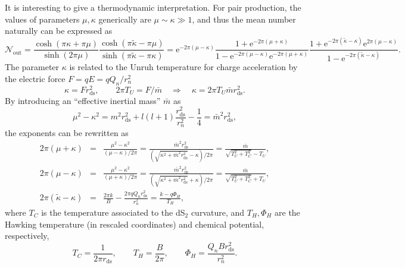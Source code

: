 \documentclass[aps,nofootinbib,superscriptaddress
]{revtex4}
\begin{document}
It is interesting to give a thermodynamic interpretation. For pair production, the values of parameters $\mu, \kappa$ generically are $\mu \sim \kappa \gg 1$, and thus the mean number naturally can be expressed as
\begin{equation}
\mathcal{N}_\mathrm{out} = \frac{\cosh(\pi \kappa + \pi \mu)}{\sinh(2 \pi \mu)} \frac{\cosh(\pi \tilde{\kappa} - \pi \mu)}{\sinh(\pi \tilde{\kappa} - \pi \kappa)} = \mathrm{e}^{-2 \pi(\mu - \kappa)} \frac{1 + \mathrm{e}^{-2 \pi (\mu + \kappa)}}{1 - \mathrm{e}^{-2 \pi (\mu - \kappa)} \mathrm{e}^{-2 \pi (\mu + \kappa)}} \frac{1 + \mathrm{e}^{-2 \pi (\tilde{\kappa} - \kappa)} \mathrm{e}^{2 \pi (\mu - \kappa)}}{1 - \mathrm{e}^{-2 \pi (\tilde{\kappa} - \kappa)}}.
\end{equation}
The parameter $\kappa$ is related to the Unruh temperature for charge acceleration by the electric force $F = q E = q Q_n/r_n^2$
\begin{equation}
\kappa = F r_\mathrm{ds}^2, \qquad 2 \pi T_U = F / \bar{m} \quad \Rightarrow \quad \kappa = 2 \pi T_U \bar{m} r_\mathrm{ds}^2.
\end{equation}
By introducing an ``effective inertial mass'' $\bar{m}$ as
\begin{equation}
\mu^2 - \kappa^2 = m^2 r_\mathrm{ds}^2 + l (l +1) \frac{r_\mathrm{ds}^2}{r_n^2} - \frac14 = \bar{m}^2 r_\mathrm{ds}^2,
\end{equation}
the exponents can be rewritten as
\begin{eqnarray}
2 \pi (\mu + \kappa) &=& \frac{\mu^2 - \kappa^2}{(\mu - \kappa)/2 \pi} = \frac{\bar{m}^2 r_\mathrm{ds}^2}{\left( \sqrt{\kappa^2 + \bar{m}^2 r_\mathrm{ds}^2} - \kappa \right)/2 \pi} = \frac{\bar m}{\sqrt{T_U^2 + T_C^2} - T_U},
\nonumber\\
2 \pi (\mu - \kappa) &=& \frac{\mu^2 - \kappa^2}{(\mu + \kappa)/2 \pi} = \frac{\bar{m}^2 r_\mathrm{ds}^2}{\left( \sqrt{\kappa^2 + \bar{m}^2 r_\mathrm{ds}^2} + \kappa \right)/2 \pi} = \frac{\bar m}{\sqrt{T_U^2 + T_C^2} + T_U},
\\
2 \pi (\tilde{\kappa} - \kappa) &=& \frac{2 \pi k}{B} - \frac{2 \pi q Q_n r_\mathrm{ds}^2}{r_n^2} = \frac{k - q \Phi_H}{T_H},
\nonumber
\end{eqnarray}
where $T_C$ is the temperature associated to the dS$_2$ curvature, and $T_H, \Phi_H$ are the Hawking temperature (in rescaled coordinates) and chemical potential, respectively,
\begin{equation}
T_C = \frac1{2 \pi r_\mathrm{ds}}, \qquad T_H = \frac{B}{2 \pi}, \qquad \Phi_H = \frac{Q_n B r_\mathrm{ds}^2}{r_n^2}.
\end{equation}
\end{document}

